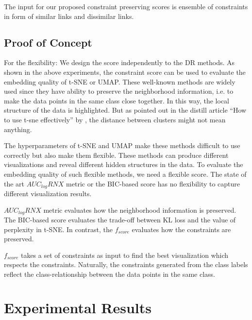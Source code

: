 The input for our proposed constraint preserving scores is ensemble of constraints in form of similar links and dissimilar links.


\subsection{Proof of Concept}


For the flexibility:
We design the score independently to the DR methods.
As shown in the above experiments, the constraint score can be used to evaluate the embedding quality of t-SNE or UMAP.
These well-known methods are widely used since they have ability to preserve the neighborhood information, i.e. to make the data points in the same class close together.
In this way, the local structure of the data is highlighted.
But as pointed out in the distill article ``How to use t-sne effectively'' by \citet{wattenberg2016use}, the distance between clusters might not mean anything.

The hyperparameters of t-SNE and UMAP make these methods difficult to use correctly but also make them flexible.
These methods can produce different visualizations and reveal different hidden structures in the data.
To evaluate the embedding quality of such flexible methods, we need a flexible score.
The state of the art $AUC_{log}RNX$ metric or the BIC-based score has no flexibility to capture different visualization results.

$AUC_{log}RNX$ metric evaluates how the neighborhood information is preserved.
The BIC-based score evaluates the trade-off between KL loss and the value of perplexity in t-SNE.
In contrast, the $f_{score}$ evaluates how the constraints are preserved.

$f_{score}$ takes a set of constraints as input to find the best visualization which respects the constraints.
Naturally, the constraints generated from the class labels reflect the class-relationship between the data points in the same class.



\section{Experimental Results}\label{sec:results}



